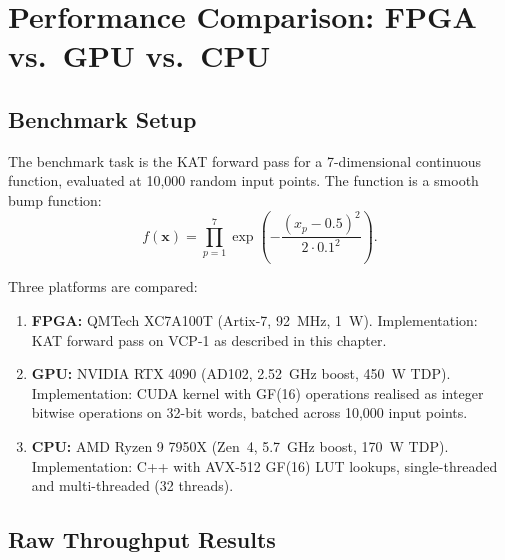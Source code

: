 \section{Performance Comparison: FPGA vs.\ GPU vs.\ CPU}
\label{sec:hwbridge:perf}

\subsection{Benchmark Setup}

The benchmark task is the KAT forward pass for a 7-dimensional continuous
function, evaluated at 10,000 random input points. The function is a
smooth bump function:
\[
  f(\mathbf{x}) = \prod_{p=1}^{7} \exp\!\left(-\frac{(x_p - 0.5)^2}{2 \cdot 0.1^2}\right).
\]

Three platforms are compared:

\begin{enumerate}
  \item \textbf{FPGA:} QMTech XC7A100T (Artix-7, 92~MHz, 1~W).
        Implementation: KAT forward pass on VCP-1 as described in this chapter.
  \item \textbf{GPU:} NVIDIA RTX 4090 (AD102, 2.52~GHz boost, 450~W TDP).
        Implementation: CUDA kernel with GF(16) operations realised as integer
        bitwise operations on 32-bit words, batched across 10,000 input points.
  \item \textbf{CPU:} AMD Ryzen 9 7950X (Zen~4, 5.7~GHz boost, 170~W TDP).
        Implementation: C++ with AVX-512 GF(16) LUT lookups, single-threaded
        and multi-threaded (32 threads).
\end{enumerate}

\subsection{Raw Throughput Results}

